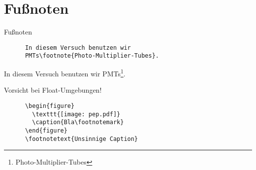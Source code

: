 \section{Fußnoten}
\begin{frame}[fragile]{Fußnoten}
  \begin{CodeExample}{0.5}
    \begin{lstlisting}
      In diesem Versuch benutzen wir 
      PMTs\footnote{Photo-Multiplier-Tubes}.
    \end{lstlisting}
    \CodeResult
    In diesem Versuch benutzen wir PMTs\footnote{Photo-Multiplier-Tubes}.
  \end{CodeExample}
  

  \begin{alerttblock}{Vorsicht bei Float-Umgebungen!}
    \begin{lstlisting}
      \begin{figure}
        \texttt{[image: pep.pdf]}
        \caption{Bla\footnotemark}
      \end{figure}
      \footnotetext{Unsinnige Caption}
    \end{lstlisting}
  \end{alerttblock}
\end{frame}


